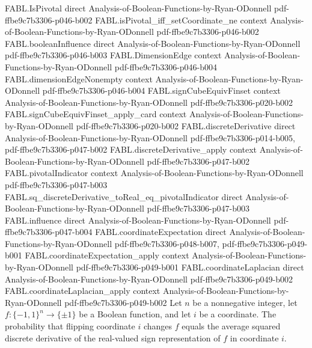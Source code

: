 \begin{theorem}
  {FABL.IsPivotal}
  {direct}
  {Analysis-of-Boolean-Functions-by-Ryan-ODonnell}
  {pdf-ffbe9c7b3306-p046-b002}
\proofstep
  {FABL.isPivotal_iff_setCoordinate_ne}
  {context}
  {Analysis-of-Boolean-Functions-by-Ryan-ODonnell}
  {pdf-ffbe9c7b3306-p046-b002}
\proofstep
  {FABL.booleanInfluence}
  {direct}
  {Analysis-of-Boolean-Functions-by-Ryan-ODonnell}
  {pdf-ffbe9c7b3306-p046-b003}
\proofstep
  {FABL.DimensionEdge}
  {context}
  {Analysis-of-Boolean-Functions-by-Ryan-ODonnell}
  {pdf-ffbe9c7b3306-p046-b004}
\proofstep
  {FABL.dimensionEdgeNonempty}
  {context}
  {Analysis-of-Boolean-Functions-by-Ryan-ODonnell}
  {pdf-ffbe9c7b3306-p046-b004}
\proofstep
  {FABL.signCubeEquivFinset}
  {context}
  {Analysis-of-Boolean-Functions-by-Ryan-ODonnell}
  {pdf-ffbe9c7b3306-p020-b002}
\proofstep
  {FABL.signCubeEquivFinset_apply_card}
  {context}
  {Analysis-of-Boolean-Functions-by-Ryan-ODonnell}
  {pdf-ffbe9c7b3306-p020-b002}
\proofstep
  {FABL.discreteDerivative}
  {direct}
  {Analysis-of-Boolean-Functions-by-Ryan-ODonnell}
  {pdf-ffbe9c7b3306-p014-b005,
    pdf-ffbe9c7b3306-p047-b002}
\proofstep
  {FABL.discreteDerivative_apply}
  {context}
  {Analysis-of-Boolean-Functions-by-Ryan-ODonnell}
  {pdf-ffbe9c7b3306-p047-b002}
\proofstep
  {FABL.pivotalIndicator}
  {context}
  {Analysis-of-Boolean-Functions-by-Ryan-ODonnell}
  {pdf-ffbe9c7b3306-p047-b003}
\proofstep
  {FABL.sq_discreteDerivative_toReal_eq_pivotalIndicator}
  {direct}
  {Analysis-of-Boolean-Functions-by-Ryan-ODonnell}
  {pdf-ffbe9c7b3306-p047-b003}
\proofstep
  {FABL.influence}
  {direct}
  {Analysis-of-Boolean-Functions-by-Ryan-ODonnell}
  {pdf-ffbe9c7b3306-p047-b004}
\proofstep
  {FABL.coordinateExpectation}
  {direct}
  {Analysis-of-Boolean-Functions-by-Ryan-ODonnell}
  {pdf-ffbe9c7b3306-p048-b007,
    pdf-ffbe9c7b3306-p049-b001}
\proofstep
  {FABL.coordinateExpectation_apply}
  {context}
  {Analysis-of-Boolean-Functions-by-Ryan-ODonnell}
  {pdf-ffbe9c7b3306-p049-b001}
\proofstep
  {FABL.coordinateLaplacian}
  {direct}
  {Analysis-of-Boolean-Functions-by-Ryan-ODonnell}
  {pdf-ffbe9c7b3306-p049-b002}
\proofstep
  {FABL.coordinateLaplacian_apply}
  {context}
  {Analysis-of-Boolean-Functions-by-Ryan-ODonnell}
  {pdf-ffbe9c7b3306-p049-b002}
Let $n$ be a nonnegative integer, let $f:\{-1,1\}^n\to\{\pm1\}$ be a Boolean
function, and let $i$ be a coordinate. The probability that flipping coordinate $i$
changes $f$ equals the average squared discrete derivative of the real-valued sign
representation of $f$ in coordinate $i$.
\end{theorem}

